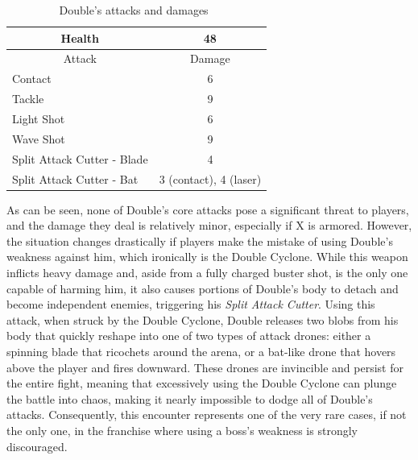 \begin{table}[htp]
	\centering
	\begin{tabular}[h]{l c}
		\toprule
		\multicolumn{1}{c}{Health}  & 48\\
		\midrule
		\multicolumn{1}{c}{Attack} & \multicolumn{1}{c}{Damage}\\
		Contact & 6 \\
		Tackle & 9 \\
		Light Shot & 6\\
		Wave Shot& 9\\
		Split Attack Cutter - Blade & 4\\
		Split Attack Cutter - Bat & 3 (contact), 4 (laser)\\
		\bottomrule
	\end{tabular}
	\caption{Double's attacks and damages~\cite{book:Compendium,wiki:Double}}
\end{table}
As can be seen, none of Double's core attacks pose a significant threat to players, and the damage they deal is relatively minor, especially if X is armored. However, the situation changes drastically if players make the mistake of using Double's weakness against him, which ironically is the Double Cyclone. While this weapon inflicts heavy damage and, aside from a fully charged buster shot, is the only one capable of harming him, it also causes portions of Double's body to detach and become independent enemies, triggering his \emph{Split Attack Cutter}. Using this attack, when struck by the Double Cyclone, Double releases two blobs from his body that quickly reshape into one of two types of attack drones: either a spinning blade that ricochets around the arena, or a bat-like drone that hovers above the player and fires downward. These drones are invincible and persist for the entire fight, meaning that excessively using the Double Cyclone can plunge the battle into chaos, making it nearly impossible to dodge all of Double's attacks. Consequently, this encounter represents one of the very rare cases, if not the only one, in the franchise where using a boss’s weakness is strongly discouraged.


